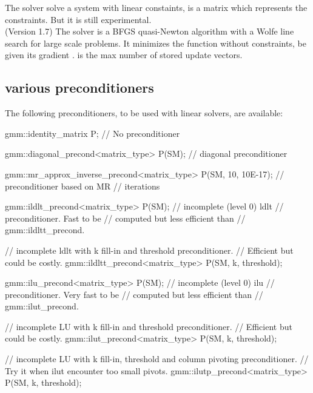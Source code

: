 \documentclass[11pt,a4paper]{article}
\begin{document}
The solver  solve a system with linear constaints,  is a matrix which represents the constraints. But it is still experimental.\\

(Version 1.7) The solver  is a BFGS quasi-Newton algorithm with a Wolfe line search for large scale problems. It minimizes the function  without constraints, be given its gradient .  is the max number of stored update vectors.

\subsection{various preconditioners}
The following preconditioners, to be used with linear solvers, are available: 
\begin{cppcode}
  gmm::identity_matrix P;   // No preconditioner 

  gmm::diagonal_precond<matrix_type> P(SM); // diagonal preconditioner
 
  gmm::mr_approx_inverse_precond<matrix_type> P(SM, 10, 10E-17);
                                               // preconditioner based on MR
                                               // iterations

  gmm::ildlt_precond<matrix_type> P(SM); // incomplete (level 0) ldlt 
                                        // preconditioner. Fast to be
                                        // computed but less efficient than
                                        // gmm::ildltt_precond.

  // incomplete ldlt with k fill-in and threshold preconditioner.
  // Efficient but could be costly.
  gmm::ildltt_precond<matrix_type> P(SM, k, threshold);

  gmm::ilu_precond<matrix_type> P(SM);  // incomplete (level 0) ilu 
                                        // preconditioner. Very fast to be
                                        // computed but less efficient than
                                        // gmm::ilut_precond.


  // incomplete LU with k fill-in and threshold preconditioner.
  // Efficient but could be costly.
  gmm::ilut_precond<matrix_type> P(SM, k, threshold);

  // incomplete LU with k fill-in, threshold and column pivoting preconditioner.
  // Try it when ilut encounter too small pivots. 
  gmm::ilutp_precond<matrix_type> P(SM, k, threshold);
\end{cppcode}
\end{document}
